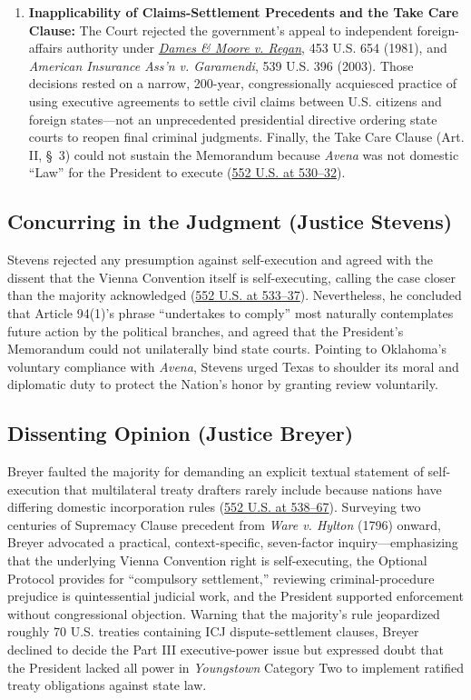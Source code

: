\documentclass[12pt]{article}
\begin{document}
\begin{enumerate}
  \item \textbf{Inapplicability of Claims-Settlement Precedents and the Take Care Clause:} The Court rejected the government's appeal to independent foreign-affairs authority under \href{https://supreme.justia.com/cases/federal/us/453/654/}{\textit{Dames \& Moore v. Regan}}, 453 U.S. 654 (1981), and \textit{American Insurance Ass'n v. Garamendi}, 539 U.S. 396 (2003). Those decisions rested on a narrow, 200-year, congressionally acquiesced practice of using executive agreements to settle civil claims between U.S. citizens and foreign states---not an unprecedented presidential directive ordering state courts to reopen final criminal judgments. Finally, the Take Care Clause (Art. II, \S~3) could not sustain the Memorandum because \textit{Avena} was not domestic ``Law'' for the President to execute (\href{https://supreme.justia.com/cases/federal/us/552/491/}{552 U.S. at 530--32}).
\end{enumerate}

\subsection{Concurring in the Judgment (Justice Stevens)}

Stevens rejected any presumption against self-execution and agreed with the dissent that the Vienna Convention itself is self-executing, calling the case closer than the majority acknowledged (\href{https://supreme.justia.com/cases/federal/us/552/491/}{552 U.S. at 533--37}). Nevertheless, he concluded that Article 94(1)'s phrase ``undertakes to comply'' most naturally contemplates future action by the political branches, and agreed that the President's Memorandum could not unilaterally bind state courts. Pointing to Oklahoma's voluntary compliance with \textit{Avena}, Stevens urged Texas to shoulder its moral and diplomatic duty to protect the Nation's honor by granting review voluntarily.

\subsection{Dissenting Opinion (Justice Breyer)}

Breyer faulted the majority for demanding an explicit textual statement of self-execution that multilateral treaty drafters rarely include because nations have differing domestic incorporation rules (\href{https://supreme.justia.com/cases/federal/us/552/491/}{552 U.S. at 538--67}). Surveying two centuries of Supremacy Clause precedent from \textit{Ware v. Hylton} (1796) onward, Breyer advocated a practical, context-specific, seven-factor inquiry---emphasizing that the underlying Vienna Convention right is self-executing, the Optional Protocol provides for ``compulsory settlement,'' reviewing criminal-procedure prejudice is quintessential judicial work, and the President supported enforcement without congressional objection. Warning that the majority's rule jeopardized roughly 70 U.S. treaties containing ICJ dispute-settlement clauses, Breyer declined to decide the Part III executive-power issue but expressed doubt that the President lacked all power in \textit{Youngstown} Category Two to implement ratified treaty obligations against state law.
\end{document}
